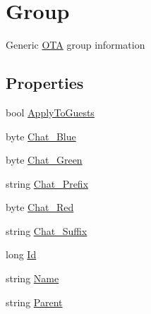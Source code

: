 \hypertarget{classOTA_1_1Data_1_1Group}{}\section{Group}
\label{classOTA_1_1Data_1_1Group}


Generic \hyperlink{namespaceOTA}{O\+T\+A} group information  


\subsection*{Properties}
\begin{DoxyCompactItemize}
\item 
bool \hyperlink{classOTA_1_1Data_1_1Group_a29e638d258230ab33b5e4568853f1adf}{Apply\+To\+Guests}
\item 
byte \hyperlink{classOTA_1_1Data_1_1Group_a0f7edf7620a40e85addfc36bdffd333b}{Chat\+\_\+\+Blue}
\item 
byte \hyperlink{classOTA_1_1Data_1_1Group_ace242183b69c04bd54608cd36e8b5251}{Chat\+\_\+\+Green}
\item 
string \hyperlink{classOTA_1_1Data_1_1Group_adb9c743b57dea1846ea2e5d2321b350f}{Chat\+\_\+\+Prefix}
\item 
byte \hyperlink{classOTA_1_1Data_1_1Group_af83cc8d33e6c1098138c19b43492e5de}{Chat\+\_\+\+Red}
\item 
string \hyperlink{classOTA_1_1Data_1_1Group_ae04eb0be7f3f33d933329a3561ff1d97}{Chat\+\_\+\+Suffix}
\item 
long \hyperlink{classOTA_1_1Data_1_1Group_ae9b19c3ce0c8c0be64991f7a4370fec7}{Id}
\item 
string \hyperlink{classOTA_1_1Data_1_1Group_a7ee9065718e6628dc7791b756fa6c0f9}{Name}
\item 
string \hyperlink{classOTA_1_1Data_1_1Group_a08af004a8b78a8e9eab64e7f1fda042c}{Parent}
\end{DoxyCompactItemize}


